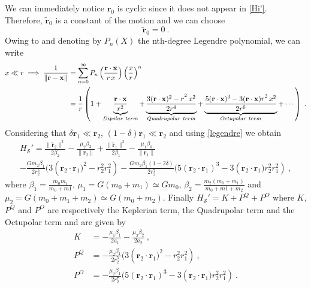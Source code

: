 \documentclass[a4paper]{article}
\begin{document}
We can immediately notice $\mathbf r_{0}$ is cyclic since it does not appear in \eqref{Hi'}. Therefore, $\mathbf {\tilde r}_{0}$ is a constant of the motion and we can choose 
\begin{equation}
\mathbf {\tilde r}_{0}=0 \ .
\end{equation}
Owing to \cite{Duriez} and denoting by $P_{n}(X)$ the nth-degree Legendre polynomial, we can write
\begin{align}
x\ll r \implies \frac{1}{\|\mathbf r - \mathbf x\|}
&=\displaystyle\sum_{n=0}^{\infty} P_{n}\left(\frac{\mathbf r \cdot \mathbf x}{r\, x }\right)\left( \frac{x}{r} \right)^{n}  \notag \\
&=\frac{1}{r}
\left(
1
+\underbrace{\frac{\mathbf r \cdot \mathbf x}{r^{2}}}_{Dipolar \ term}
+\underbrace{\frac{3(\mathbf r \cdot {\mathbf x)^2- r }^2 \, { x }^2}{2r^{4}}}_{Quadrupolar \ term}
+\underbrace{\frac{5(\mathbf r \cdot \mathbf x)^3-3(\mathbf r \cdot {\mathbf x) r }^2 \, { x }^2}{2r^{6}}}_{Octupolar \ term}
+\cdots \right) \ .
\label{legendre}
\end{align}
Considering that $\delta \mathbf r_{1}\ll \mathbf r_{2}$, $(1-\delta)\mathbf r_{1}\ll \mathbf r_{2}$ and using \eqref{legendre} we obtain
\begin{multline}
H_\mathcal S'=
\frac{\| \mathbf {\tilde r}_{2} \|^{2}}{2\beta_{2}}
-\frac{\mu_{2}\beta_{2}}{\|\mathbf r_{2}\|} 
+\frac{\| \mathbf {\tilde r}_{1} \|^{2}}{2\beta_{1}}
-\frac{\mu_{1}\beta_{1}}{\|\mathbf r_{1}\|} \\
-\frac{Gm_{2}\beta_{1}}{2r_{2}^{5}}(3(\mathbf r_{2}\cdot {\mathbf r_{1})^2-r_{2}^{2}r_{1}^{2}})
-\frac{Gm_{2}\beta_{1}(1-2\delta)}{2r_{2}^{7}}(5(\mathbf r_{2}\cdot \mathbf r_{1})^3-3(\mathbf r_{2}\cdot {\mathbf r_{1})r_{2}^{2}r_{1}^{2}}) \ ,
\end{multline}
where $\beta_{1}=\frac{m_{0}m_{1}}{m_{0}+m{1}}$, \; $\mu_{1}=G(m_{0}+m_{1})\simeq G m_{0}$, \; $\beta_{2}=\frac{m_{2}(m_{0}+m_{1})}{m_{0}+m{1}+m_{2}}$ and $\mu_{2}=G(m_{0}+m_{1}+m_{2})\simeq G(m_{0}+m_{2})$.
Finally $H_\mathcal S'=K+P^{Q}+P^{O}$ where $K$, $P^{Q}$ and $P^{O}$ are respectively the Keplerian term, the Quadrupolar term and the Octupolar term and are given by
\begin{align}
K&=-\frac{\mu_{1}\beta_{1}}{2a_{1}}-\frac{\mu_{2}\beta_{2}}{2a_{2}} \ , \\
P^{Q}&=-\frac{\mu_{2}\beta_{1}}{2r_{2}^{5}}(3(\mathbf r_{2}\cdot {\mathbf r_{1})^2-r_{2}^{2}r_{1}^{2}}) \ , \\
P^{O}&=-\frac{\mu_{2}\beta_{1}}{2r_{2}^{7}}(5(\mathbf r_{2}\cdot \mathbf r_{1})^3-3(\mathbf r_{2}\cdot {\mathbf r_{1})r_{2}^{2}r_{1}^{2}}) \ . \label{Octupolar}
\end{align}
\end{document}
